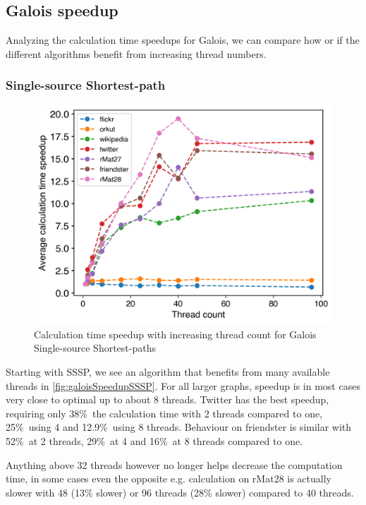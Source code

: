



\subsection{Galois speedup}
\label{sec:galois_speedup}
Analyzing the calculation time speedups for Galois, we can compare how or if the different algorithms benefit from increasing thread numbers.

\subsubsection{Single-source Shortest-path}
\begin{figure}
	\includegraphics[width=\linewidth]{../../plots/singleNodeSSSPGaloisThreads.png}
	\caption{Calculation time speedup with increasing thread count for Galois Single-source Shortest-paths}
	\label{fig:galoisSpeedupSSSP}
\end{figure}
Starting with SSSP, we see an algorithm that benefits from many available threads in \autoref{fig:galoisSpeedupSSSP}.
For all larger graphs, speedup is in most cases very close to optimal up to about 8 threads. 
Twitter has the best speedup, requiring only 38\%\ the calculation time with 2 threads compared to one, 25\%\ using 4 and 12.9\%\ using 8 threads.
Behaviour on friendster is similar with 52\%\ at 2 threads, 29\%\ at 4 and 16\%\ at 8 threads compared to one.

Anything above 32 threads however no longer helps decrease the computation time, in some cases even the opposite e.g. calculation on rMat28 is actually slower with 48 (13\% slower) or 96 threads (28\% slower) compared to 40 threads.

